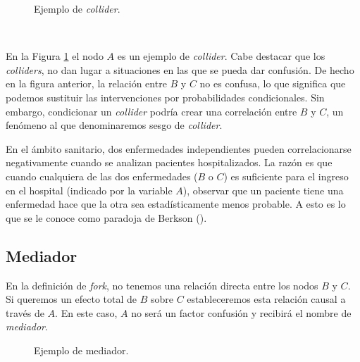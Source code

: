 \documentclass[oneside,openright,titlepage,numbers=noenddot,openany,headinclude,footinclude=true,
cleardoublepage=empty,abstractoff,BCOR=5mm,paper=a4,fontsize=12pt,main=spanish]{scrreprt}
\begin{document}
\begin{figure}[h]
\centering
{}
\caption{Ejemplo de \textit{collider}.}
\label{fig:collider}
\end{figure}\

En la Figura \ref{fig:collider} el nodo $A$ es un ejemplo de \textit{collider}. Cabe destacar que los \textit{colliders}, no dan lugar a situaciones en las que se pueda dar confusión. De hecho en la figura anterior, la relación entre $B$ y $C$ no es confusa, lo que significa que podemos sustituir las intervenciones por probabilidades condicionales. Sin embargo, condicionar un \textit{collider} podría crear una correlación entre $B$ y $C$, un fenómeno al que denominaremos sesgo de \textit{collider}. 

\begin{example}
En el ámbito sanitario, dos enfermedades independientes pueden correlacionarse negativamente cuando se analizan pacientes hospitalizados. La razón es que cuando cualquiera de las dos enfermedades ($B$ o $C$) es suficiente para el ingreso en el hospital (indicado por la variable $A$), observar que un paciente tiene una enfermedad hace que la otra sea estadísticamente menos probable. A esto es lo que se le conoce como paradoja de Berkson (\cite{berksonparadox2014}).
\end{example}

\subsection{Mediador}

En la definición de \textit{fork}, no tenemos una relación directa entre los nodos $B$ y $C$. Si queremos un efecto total de $B$ sobre $C$ estableceremos esta relación causal a través de $A$. En este caso, $A$ no será un factor confusión y recibirá el nombre de \textit{mediador}.\\

\begin{figure}[h]
\centering
{}
\caption{Ejemplo de mediador.}
\label{fig:mediator}
\end{figure}
\end{document}
